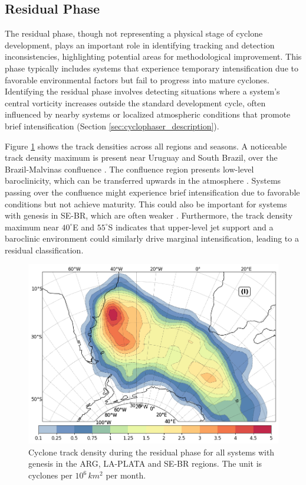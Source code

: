 \subsection{Residual Phase}\label{residual_phase}


The residual phase, though not representing a physical stage of cyclone development, plays an important role in identifying tracking and detection inconsistencies, highlighting potential areas for methodological improvement. This phase typically includes systems that experience temporary intensification due to favorable environmental factors but fail to progress into mature cyclones. Identifying the residual phase involves detecting situations where a system's central vorticity increases outside the standard development cycle, often influenced by nearby systems or localized atmospheric conditions that promote brief intensification (Section \ref{sec:cyclophaser_description}).

Figure \ref{fig:residual} shows the track densities across all regions and seasons. A noticeable track density maximum is present near Uruguay and South Brazil, over the Brazil-Malvinas confluence \citep{gordon1989brazil}. The confluence region presents low-level baroclinicity, which can be transferred upwards in the atmosphere \citep[e.g.,]{sanders1980synoptic, vera2002cold}. Systems passing over the confluence might experience brief intensification due to favorable conditions but not achieve maturity. This could also be important for systems with genesis in SE-BR, which are often weaker \citep{sinclair1995climatology, hoskins2005new}. Furthermore, the track density maximum near \(40^\circ\)E and \(55^\circ\)S indicates that upper-level jet support \citep[e.g.,]{swart2015comparing} and a baroclinic environment \citep[e.g.,]{hoskins2005new} could similarly drive marginal intensification, leading to a residual classification.

\begin{figure}[!htbp]
\centering
\includegraphics[width=\textwidth]{figs_4/density_map_residual_aggregate.png}
\caption[Track Density - Residual Phase]{Cyclone track density during the residual phase for all systems with genesis in the ARG, LA-PLATA and SE-BR regions. The unit is cyclones per \(10^6 \, km^2\) per month.}
\label{fig:residual}
\end{figure}


